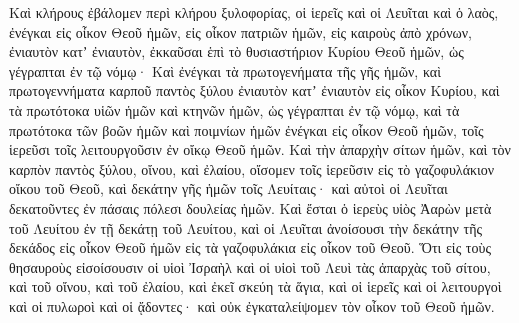 {\par }{\PP {}Καὶ κλήρους ἐβάλομεν περὶ κλήρου ξυλοφορίας, οἱ ἱερεῖς καὶ οἱ Λευῖται καὶ ὁ λαὸς, ἐνέγκαι εἰς οἶκον Θεοῦ ἡμῶν, εἰς οἶκον πατριῶν ἡμῶν, εἰς καιροὺς ἀπὸ χρόνων, ἐνιαυτὸν κατʼ ἐνιαυτὸν, ἐκκαῦσαι ἑπὶ τὸ θυσιαστήριον Κυρίου Θεοῦ ἡμῶν, ὡς γέγραπται ἐν τῷ νόμῳ·
Καὶ ἐνέγκαι τὰ πρωτογενήματα τῆς γῆς ἡμῶν, καὶ πρωτογεννήματα καρποῦ παντὸς ξύλου ἐνιαυτὸν κατʼ ἐνιαυτὸν εἰς οἶκον Κυρίου,
καὶ τὰ πρωτότοκα υἱῶν ἡμῶν καὶ κτηνῶν ἡμῶν, ὡς γέγραπται ἐν τῷ νόμῳ, καὶ τὰ πρωτότοκα τῶν βοῶν ἡμῶν καὶ ποιμνίων ἡμῶν ἐνέγκαι εἰς οἶκον Θεοῦ ἡμῶν, τοῖς ἱερεῦσι τοῖς λειτουργοῦσιν ἐν οἴκῳ Θεοῦ ἡμῶν.
Καὶ τὴν ἀπαρχὴν σίτων ἡμῶν, καὶ τὸν καρπὸν παντὸς ξύλου, οἴνου, καὶ ἐλαίου, οἴσομεν τοῖς ἱερεῦσιν εἰς τὸ γαζοφυλάκιον οἴκου τοῦ Θεοῦ, καὶ δεκάτην γῆς ἡμῶν τοῖς Λευίταις· καὶ αὐτοὶ οἱ Λευῖται δεκατοῦντες ἐν πάσαις πόλεσι δουλείας ἡμῶν.
Καὶ ἔσται ὁ ἱερεὺς υἱὸς Ἀαρὼν μετὰ τοῦ Λευίτου ἐν τῇ δεκάτῃ τοῦ Λευίτου, καὶ οἱ Λευῖται ἀνοίσουσι τὴν δεκάτην τῆς δεκάδος εἰς οἶκον Θεοῦ ἡμῶν εἰς τὰ γαζοφυλάκια εἰς οἶκον τοῦ Θεοῦ.
Ὅτι εἰς τοὺς θησαυροὺς εἰσοίσουσιν οἱ υἱοὶ Ἰσραὴλ καὶ οἱ υἱοὶ τοῦ Λευὶ τὰς ἀπαρχὰς τοῦ σίτου, καὶ τοῦ οἴνου, καὶ τοῦ ἐλαίου, καὶ ἐκεῖ σκεύη τὰ ἅγια, καὶ οἱ ἱερεῖς καὶ οἱ λειτουργοὶ καὶ οἱ πυλωροὶ καὶ οἱ ᾄδοντες· καὶ οὐκ ἐγκαταλείψομεν τὸν οἶκον τοῦ Θεοῦ ἡμῶν.

}
